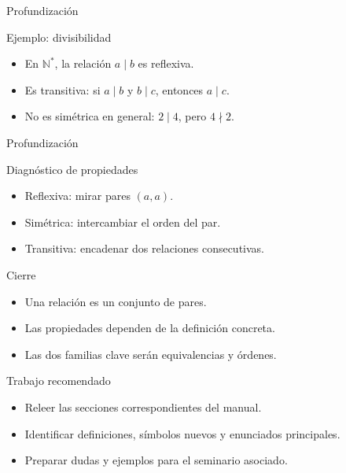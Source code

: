 \documentclass[aspectratio=169,11pt]{beamer}
\begin{document}
\begin{frame}{Profundización}
\begin{block}{Ejemplo: divisibilidad}
\begin{itemize}
  \item En \(\mathbb{N}^{\ast}\), la relación \(a\mid b\) es reflexiva.
  \item Es transitiva: si \(a\mid b\) y \(b\mid c\), entonces \(a\mid c\).
  \item No es simétrica en general: \(2\mid 4\), pero \(4\nmid 2\).
\end{itemize}
\end{block}
\end{frame}

\begin{frame}{Profundización}
\begin{block}{Diagnóstico de propiedades}
\begin{itemize}
  \item Reflexiva: mirar pares \((a,a)\).
  \item Simétrica: intercambiar el orden del par.
  \item Transitiva: encadenar dos relaciones consecutivas.
\end{itemize}
\end{block}
\end{frame}

\begin{frame}{Cierre}
\begin{itemize}
  \item Una relación es un conjunto de pares.
  \item Las propiedades dependen de la definición concreta.
  \item Las dos familias clave serán equivalencias y órdenes.
\end{itemize}
\end{frame}

\begin{frame}{Trabajo recomendado}
\begin{itemize}
  \item Releer las secciones correspondientes del manual.
  \item Identificar definiciones, símbolos nuevos y enunciados principales.
  \item Preparar dudas y ejemplos para el seminario asociado.
\end{itemize}
\end{frame}
\end{document}
